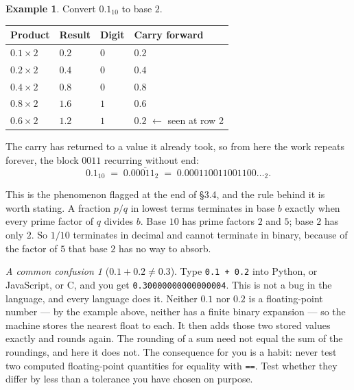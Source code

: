 \documentclass[11pt]{article}
\theoremstyle{plain}
\theoremstyle{definition}
\newtheorem{ex}{Example}[section]
\theoremstyle{remark}
\newtheorem*{warn}{A common confusion}
\begin{document}
\begin{ex}
Convert $0.1_{10}$ to base $2$.

\begin{center}
\renewcommand{\arraystretch}{1.15}
\begin{tabular}{@{}l l l l@{}}
\toprule
\textbf{Product} & \textbf{Result} & \textbf{Digit} & \textbf{Carry forward} \\
\midrule
$0.1\times2$ & $0.2$ & $0$ & $0.2$ \\
$0.2\times2$ & $0.4$ & $0$ & $0.4$ \\
$0.4\times2$ & $0.8$ & $0$ & $0.8$ \\
$0.8\times2$ & $1.6$ & $1$ & $0.6$ \\
$0.6\times2$ & $1.2$ & $1$ & $0.2$ \quad$\leftarrow$ seen at row 2 \\
\bottomrule
\end{tabular}
\end{center}

\noindent The carry has returned to a value it already took, so from here the
work repeats forever, the block $0011$ recurring without end:
\begin{equation*}
  0.1_{10} \;=\; 0.0\overline{0011}_{2}
            \;=\; 0.000110011001100\ldots_{2} .
  \tag*{$\blacksquare$}
\end{equation*}
\end{ex}

\noindent This is the phenomenon flagged at the end of \S3.4, and the rule
behind it is worth stating. A fraction $p/q$ in lowest terms terminates in base
$b$ exactly when every prime factor of $q$ divides $b$. Base $10$ has prime
factors $2$ and $5$; base $2$ has only $2$. So $1/10$ terminates in decimal and
cannot terminate in binary, because of the factor of $5$ that base $2$ has no
way to absorb.

\begin{warn}[$0.1+0.2\neq0.3$]
Type \texttt{0.1 + 0.2} into Python, or JavaScript, or C, and you get
\texttt{0.30000000000000004}. This is not a bug in the language, and every
language does it. Neither $0.1$ nor $0.2$ is a floating-point number ---
by the example above, neither has a finite binary expansion --- so the machine
stores the nearest float to each. It then adds those two stored values exactly
and rounds again. The rounding of a sum need not equal the sum of the
roundings, and here it does not. The consequence for you is a habit: never test
two computed floating-point quantities for equality with \texttt{==}. Test
whether they differ by less than a tolerance you have chosen on purpose.
\end{warn}
\end{document}
